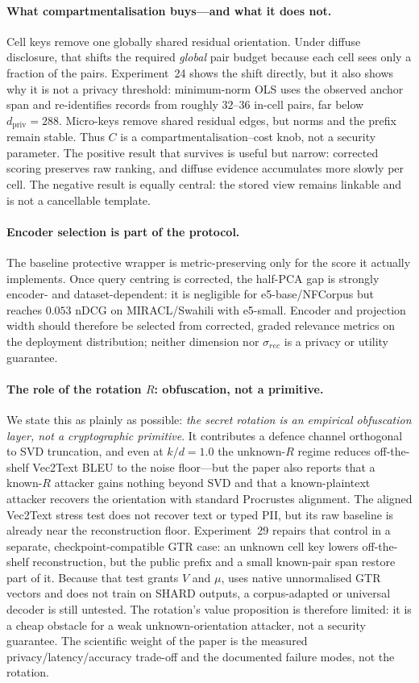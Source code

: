 \documentclass[11pt,a4paper]{article}
\begin{document}
\paragraph{What compartmentalisation buys---and what it does not.} Cell keys
remove one globally shared residual orientation. Under diffuse disclosure,
that shifts the required \emph{global} pair budget because each cell sees
only a fraction of the pairs. Experiment~24 shows the shift directly, but it
also shows why it is not a privacy threshold: minimum-norm OLS uses the
observed anchor span and re-identifies records from roughly $32$--$36$
in-cell pairs, far below $d_{\mathrm{priv}}=288$. Micro-keys remove shared
residual edges, but norms and the prefix remain stable. Thus $C$ is a
compartmentalisation--cost knob, not a security parameter. The positive
result that survives is useful but narrow: corrected scoring preserves raw
ranking, and diffuse evidence accumulates more slowly per cell. The negative
result is equally central: the stored view remains linkable and is not a
cancellable template.

\paragraph{Encoder selection is part of the protocol.} The baseline
protective wrapper is metric-preserving only for the score it actually
implements. Once query centring is corrected, the half-PCA gap is strongly
encoder- and dataset-dependent: it is negligible for e5-base/NFCorpus but
reaches $0.053$ nDCG on MIRACL/Swahili with e5-small. Encoder and projection
width should therefore be selected from corrected, graded relevance metrics
on the deployment distribution; neither dimension nor $\sigma_{rec}$ is a
privacy or utility guarantee.

\paragraph{The role of the rotation $R$: obfuscation, not a primitive.}
We state this as plainly as possible: \emph{the secret rotation is an
empirical obfuscation layer, not a cryptographic primitive}. It
contributes a defence channel orthogonal to SVD truncation, and even at
$k/d = 1.0$ the unknown-$R$ regime reduces off-the-shelf Vec2Text BLEU
to the noise floor---but the paper also reports that a known-$R$ attacker
gains nothing beyond SVD and that a known-plaintext attacker recovers the
orientation with standard Procrustes alignment. The aligned Vec2Text
stress test does not recover text or typed PII, but its raw baseline is
already near the reconstruction floor. Experiment~29 repairs that control in
a separate, checkpoint-compatible GTR case: an unknown cell key lowers
off-the-shelf reconstruction, but the public prefix and a small known-pair span
restore part of it. Because that test grants $V$ and $\mu$, uses native
unnormalised GTR vectors and does not train on SHARD outputs, a corpus-adapted
or universal decoder is still untested. The rotation's value proposition is
therefore limited: it is a cheap obstacle
for a weak unknown-orientation attacker, not a security guarantee. The
scientific weight of the paper is the measured privacy/latency/accuracy
trade-off and the documented failure modes, not the rotation.
\end{document}
